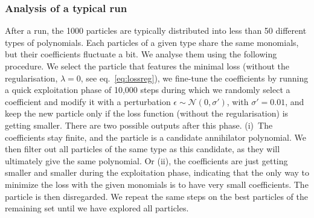 \documentclass[11pt,a4paper]{article}
\begin{document}
	
	
	\subsubsection{Analysis of a typical run}\label{sec:1runanalysis}
	After a run, the 1000 particles are typically distributed into less than 50 different types of polynomials. Each particles of a given type share the same monomials, but their coefficients fluctuate a bit. We analyse them using the following procedure. We select the particle that features the minimal loss (without the regularisation, $\lambda=0$, see eq.~\eqref{eq:lossreg}), we fine-tune the coefficients by running a quick exploitation phase of 10,000 steps during which we randomly select a coefficient and modify it with a perturbation $\epsilon \sim \mathcal{N}(0, \sigma')$, with $\sigma'=0.01$, and keep the new particle only if the loss function (without the regularisation) is getting smaller. There are two possible outputs after this phase. (i)~The coefficients stay finite, and the particle is a candidate annihilator polynomial. We then filter out all  particles of the same type as this candidate, as they will ultimately give the same polynomial. Or (ii), the coefficients are just getting smaller and smaller during the exploitation phase, indicating that the only way to minimize the loss with the given monomials is to have very small coefficients. The particle is then disregarded. We repeat the same steps on the best particles of the remaining set until we have explored all particles.
\end{document}
